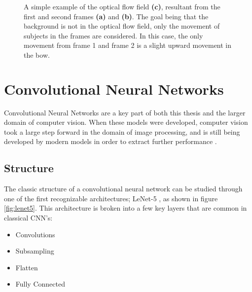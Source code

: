 \begin{figure}[ht]
	\centering
	\caption{A simple example of the optical flow field \textbf{(c)}, resultant from the first and second frames \textbf{(a)} and \textbf{(b)}. The goal being that the background is not in the optical flow field, only the movement of subjects in the frames are considered. In this case, the only movement from frame 1 and frame 2 is a slight upward movement in the bow.}
	\label{fig:opticalflow}
\end{figure}


\section{Convolutional Neural Networks}
\label{sec:CNNs}

Convolutional Neural Networks are a key part of both this thesis and the larger domain of computer vision. When these models were developed, computer vision took a large step forward in the domain of image processing, and is still being developed by modern models in order to extract further performance \cite{deeplearning}.

\subsection{Structure}

The classic structure of a convolutional neural network can be studied through one of the first recognizable architectures; LeNet-5 \cite{lenet5}, as shown in figure \ref{fig:lenet5}. This architecture is broken into a few key layers that are common in classical CNN's:

\begin{itemize}
	\item Convolutions
	\item Subsampling
	\item Flatten
	\item Fully Connected
\end{itemize}

